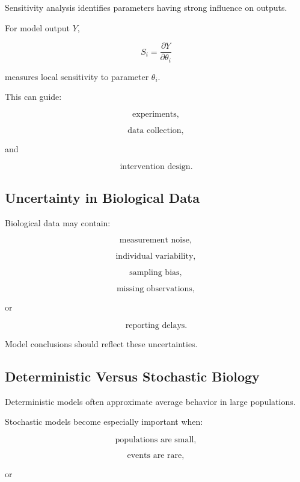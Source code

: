 Sensitivity analysis identifies parameters having strong influence on
outputs.

For model output \(Y\),

\[
\boxed{
S_i
=
\frac{\partial Y}{\partial\theta_i}
}
\]

measures local sensitivity to parameter \(\theta_i\).

This can guide:

\[
\boxed{
\text{experiments},
}
\]

\[
\boxed{
\text{data collection},
}
\]

and

\[
\boxed{
\text{intervention design}.
}
\]

\subsection{Uncertainty in Biological Data}
\label{subsec:biological-data-uncertainty}

Biological data may contain:

\[
\boxed{
\text{measurement noise},
}
\]

\[
\boxed{
\text{individual variability},
}
\]

\[
\boxed{
\text{sampling bias},
}
\]

\[
\boxed{
\text{missing observations},
}
\]

or

\[
\boxed{
\text{reporting delays}.
}
\]

Model conclusions should reflect these uncertainties.

\subsection{Deterministic Versus Stochastic Biology}
\label{subsec:deterministic-stochastic-biology}

Deterministic models often approximate average behavior in large
populations.

Stochastic models become especially important when:

\[
\boxed{
\text{populations are small},
}
\]

\[
\boxed{
\text{events are rare},
}
\]

or

